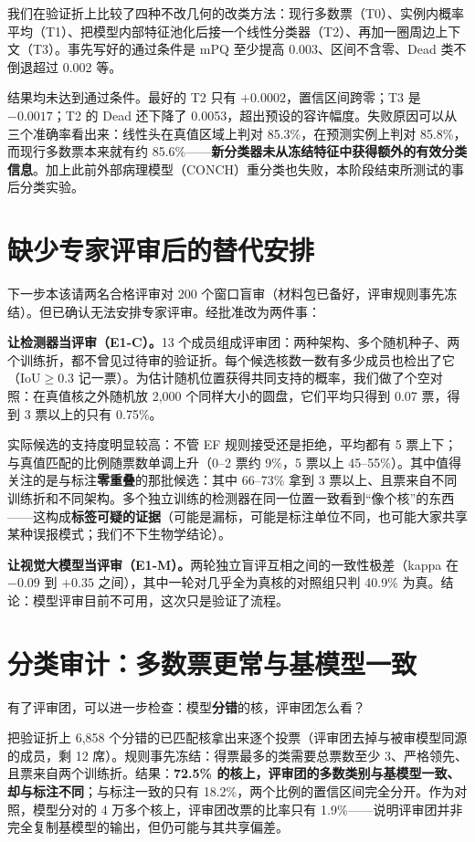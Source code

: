 \documentclass[12pt,a4paper]{article}
\begin{document}
我们在验证折上比较了四种不改几何的改类方法：现行多数票（T0）、实例内概率平均（T1）、把模型内部特征池化后接一个线性分类器（T2）、再加一圈周边上下文（T3）。事先写好的通过条件是 mPQ 至少提高 0.003、区间不含零、Dead 类不倒退超过 0.002 等。

结果均未达到通过条件。最好的 T2 只有 $+0.0002$，置信区间跨零；T3 是 $-0.0017$；T2 的 Dead 还下降了 0.0053，超出预设的容许幅度。失败原因可以从三个准确率看出来：线性头在真值区域上判对 85.3\%，在预测实例上判对 85.8\%，而现行多数票本来就有约 85.6\%——\textbf{新分类器未从冻结特征中获得额外的有效分类信息}。加上此前外部病理模型（CONCH）重分类也失败，本阶段结束所测试的事后分类实验。

\section*{缺少专家评审后的替代安排}

下一步本该请两名合格评审对 200 个窗口盲审（材料包已备好，评审规则事先冻结）。但已确认无法安排专家评审。经批准改为两件事：

\textbf{让检测器当评审（E1-C）。}13 个成员组成评审团：两种架构、多个随机种子、两个训练折，都不曾见过待审的验证折。每个候选核数一数有多少成员也检出了它（IoU$\geq$0.3 记一票）。为估计随机位置获得共同支持的概率，我们做了个空对照：在真值核之外随机放 2,000 个同样大小的圆盘，它们平均只得到 0.07 票，得到 3 票以上的只有 0.75\%。

实际候选的支持度明显较高：不管 EF 规则接受还是拒绝，平均都有 5 票上下；与真值匹配的比例随票数单调上升（0--2 票约 9\%，5 票以上 45--55\%）。其中值得关注的是与标注\textbf{零重叠}的那批候选：其中 66--73\% 拿到 3 票以上、且票来自不同训练折和不同架构。多个独立训练的检测器在同一位置一致看到“像个核”的东西——这构成\textbf{标签可疑的证据}（可能是漏标，可能是标注单位不同，也可能大家共享某种误报模式；我们不下生物学结论）。

\textbf{让视觉大模型当评审（E1-M）。}两轮独立盲评互相之间的一致性极差（kappa 在 $-0.09$ 到 $+0.35$ 之间），其中一轮对几乎全为真核的对照组只判 40.9\% 为真。结论：模型评审目前不可用，这次只是验证了流程。

\section*{分类审计：多数票更常与基模型一致}

有了评审团，可以进一步检查：模型\textbf{分错}的核，评审团怎么看？

把验证折上 6,858 个分错的已匹配核拿出来逐个投票（评审团去掉与被审模型同源的成员，剩 12 席）。规则事先冻结：得票最多的类需要总票数至少 3、严格领先、且票来自两个训练折。结果：\textbf{72.5\% 的核上，评审团的多数类别与基模型一致、却与标注不同}；与标注一致的只有 18.2\%，两个比例的置信区间完全分开。作为对照，模型分对的 4 万多个核上，评审团改票的比率只有 1.9\%——说明评审团并非完全复制基模型的输出，但仍可能与其共享偏差。
\end{document}
